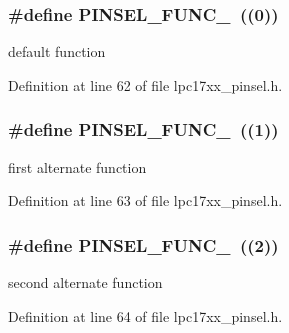 \subsubsection[{\texorpdfstring{P\+I\+N\+S\+E\+L\+\_\+\+F\+U\+N\+C\+\_\+0}{PINSEL_FUNC_0}}]{\setlength{\rightskip}{0pt plus 5cm}\#define P\+I\+N\+S\+E\+L\+\_\+\+F\+U\+N\+C\+\_~((0))}\hypertarget{group___p_i_n_s_e_l___public___macros_ga52e96a68181b78213b671c5fe8d60d33}{}\label{group___p_i_n_s_e_l___public___macros_ga52e96a68181b78213b671c5fe8d60d33}
default function 

Definition at line 62 of file lpc17xx\+\_\+pinsel.\+h.

\subsubsection[{\texorpdfstring{P\+I\+N\+S\+E\+L\+\_\+\+F\+U\+N\+C\+\_\+1}{PINSEL_FUNC_1}}]{\setlength{\rightskip}{0pt plus 5cm}\#define P\+I\+N\+S\+E\+L\+\_\+\+F\+U\+N\+C\+\_~((1))}\hypertarget{group___p_i_n_s_e_l___public___macros_gaf39d280a01f6c478d2a16996310c8754}{}\label{group___p_i_n_s_e_l___public___macros_gaf39d280a01f6c478d2a16996310c8754}
first alternate function 

Definition at line 63 of file lpc17xx\+\_\+pinsel.\+h.

\subsubsection[{\texorpdfstring{P\+I\+N\+S\+E\+L\+\_\+\+F\+U\+N\+C\+\_\+2}{PINSEL_FUNC_2}}]{\setlength{\rightskip}{0pt plus 5cm}\#define P\+I\+N\+S\+E\+L\+\_\+\+F\+U\+N\+C\+\_~((2))}\hypertarget{group___p_i_n_s_e_l___public___macros_ga658a961b569678308932fbdd1d5957c3}{}\label{group___p_i_n_s_e_l___public___macros_ga658a961b569678308932fbdd1d5957c3}
second alternate function 

Definition at line 64 of file lpc17xx\+\_\+pinsel.\+h.

